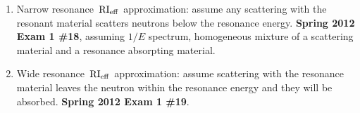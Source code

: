 \documentclass{school-22.211-notes}
\begin{document}
\begin{enumerate}
\begin{enumerate}
      \item Narrow resonance $\left. \mathrm{RI}_{\mathrm{eff}} \right.$ approximation: assume any scattering with the resonant material scatters neutrons below the resonance energy. 
        \textbf{Spring 2012 Exam 1 \#18}, assuming $1/E$ spectrum, homogeneous mixture of a scattering material and a resonance absorpting material. 
        
      \item Wide resonance $\left. \mathrm{RI}_{\mathrm{eff}} \right.$ approximation: assume scattering with the resonance material leaves the neutron within the resonance energy and they will be absorbed. \textbf{Spring 2012 Exam 1 \#19}.
      \end{enumerate}
  \end{enumerate}
\end{document}

